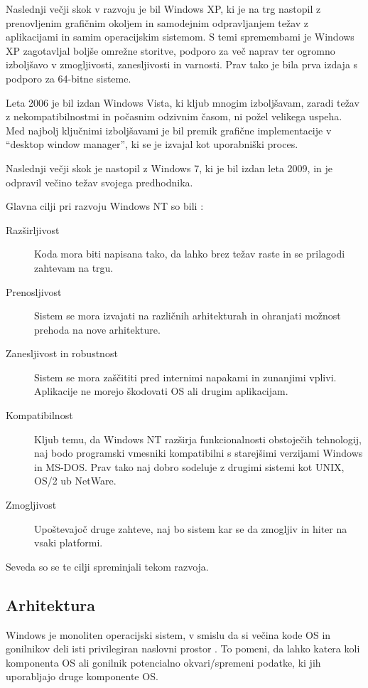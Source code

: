 \documentclass[a4paper,12pt,openright]{book}
\begin{document}
Naslednji večji skok v razvoju je bil Windows XP, ki je na trg nastopil z prenovljenim grafičnim okoljem in samodejnim odpravljanjem težav z aplikacijami in samim operacijskim sistemom.
S temi spremembami je Windows XP zagotavljal boljše omrežne storitve, podporo za več naprav ter ogromno izboljšavo v zmogljivosti, zanesljivosti in varnosti.
Prav tako je bila prva izdaja s podporo za 64-bitne sisteme.

Leta 2006 je bil izdan Windows Vista, ki kljub mnogim izboljšavam, zaradi težav z nekompatibilnostmi in počasnim odzivnim časom, ni požel velikega uspeha.
Med najbolj ključnimi izboljšavami je bil premik grafične implementacije v ``desktop window manager'', ki se je izvajal kot uporabniški proces.

Naslednji večji skok je nastopil z Windows 7, ki je bil izdan leta 2009, in je odpravil večino težav svojega predhodnika.

Glavna cilji pri razvoju Windows NT so bili \cite{Yosifovich_Russinovich_Solomon_Ionescu_2017}:
\begin{description}
	\item[Razširljivost] Koda mora biti napisana tako, da lahko brez težav raste in se prilagodi zahtevam na trgu.
	\item[Prenosljivost] Sistem se mora izvajati na različnih arhitekturah in ohranjati možnost prehoda na nove arhitekture.
	\item[Zanesljivost in robustnost] Sistem se mora zaščititi pred internimi napakami in zunanjimi vplivi. Aplikacije ne morejo škodovati OS ali drugim aplikacijam.
	\item[Kompatibilnost] Kljub temu, da Windows NT razširja funkcionalnosti obstoječih tehnologij, naj bodo programski vmesniki kompatibilni s starejšimi verzijami Windows in MS-DOS. Prav tako naj dobro sodeluje z drugimi sistemi kot UNIX, OS/2 ub NetWare.
	\item[Zmogljivost] Upoštevajoč druge zahteve, naj bo sistem kar se da zmogljiv in hiter na vsaki platformi.
\end{description}

Seveda so se te cilji spreminjali tekom razvoja.

\subsection{Arhitektura} \label{ssec:windows:architecture}

Windows je monoliten operacijski sistem, v smislu da si večina kode OS in gonilnikov deli isti privilegiran naslovni prostor \cite{Yosifovich_Russinovich_Solomon_Ionescu_2017}.
To pomeni, da lahko katera koli komponenta OS ali gonilnik potencialno okvari/spremeni podatke, ki jih uporabljajo druge komponente OS.
\end{document}
